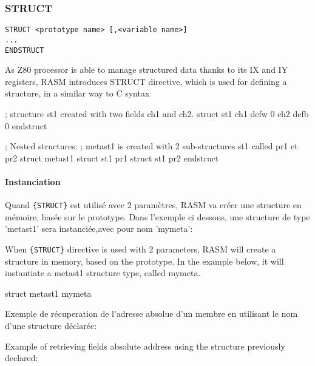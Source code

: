 
\subsubsection{STRUCT}  
\begin{verbatim}
STRUCT <prototype name> [,<variable name>]
...
ENDSTRUCT
\end{verbatim}

\begin{xen}
As Z80 processor is able to manage structured data thanks to its IX and IY registers, RASM introduces STRUCT directive, which is used for defining a structure, in a similar way to C syntax
\end{xen}

\begin{code}
; structure st1 created with two fields ch1 and ch2.
struct st1
 ch1 defw 0
 ch2 defb 0
endstruct

; Nested structures:
; metast1 is created with 2 sub-structures st1 called pr1 et pr2
struct metast1
 struct st1 pr1
 struct st1 pr2
endstruct
\end{code}



\begin{xfr}
\paragraph{Instanciation}

Quand \texttt{\{STRUCT\}} est utilisé avec 2 paramètres, RASM va créer une structure en mémoire, basée sur le prototype.
Dans l'exemple ci dessous, une structure de type 'metast1' sera instanciée,avec pour nom 'mymeta':
\end{xfr}

\begin{xen}
When \texttt{\{STRUCT\}} directive is used with 2 parameters, RASM will create a structure in memory, based on the prototype.
In the example below, it will instantiate a metast1 structure type, called mymeta.
\end{xen}

\begin{code}
struct metast1 mymeta
\end{code}

\begin{xfr}
Exemple de récuperation de l'adresse absolue d'un membre en utilisant le nom d'une structure déclarée:
\end{xfr}

\begin{xen}
Example of retrieving fields absolute address using the structure previously declared:
\end{xen}


